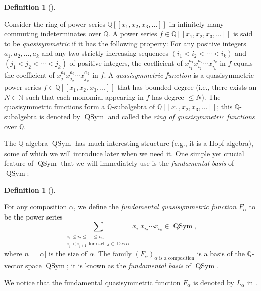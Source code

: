 \documentclass[numbers=enddot,12pt,final,onecolumn,notitlepage]{scrartcl}%
\theoremstyle{definition}
\newtheorem{defi}[theo]{Definition}
\newenvironment{definition}[1][]
{\begin{defi}[#1]\begin{leftbar}}
{\end{leftbar}\end{defi}}
\let\sumnonlimits\sum
\renewcommand{\sum}{\sumnonlimits\limits}
\begin{document}
\begin{definition}
Consider the ring of power series $\mathbb{Q}\left[  \left[  x_{1},x_{2}%
,x_{3},\ldots\right]  \right]  $ in infinitely many commuting indeterminates
over $\mathbb{Q}$. A power series $f\in\mathbb{Q}\left[  \left[  x_{1}%
,x_{2},x_{3},\ldots\right]  \right]  $ is said to be \textit{quasisymmetric}
if it has the following property: For any positive integers $a_{1}%
,a_{2},\ldots,a_{k}$ and any two strictly increasing sequences $\left(
i_{1}<i_{2}<\cdots<i_{k}\right)  $ and $\left(  j_{1}<j_{2}<\cdots
<j_{k}\right)  $ of positive integers, the coefficient of $x_{i_{1}}^{a_{1}%
}x_{i_{2}}^{a_{2}}\cdots x_{i_{k}}^{a_{k}}$ in $f$ equals the coefficient of
$x_{j_{1}}^{a_{1}}x_{j_{2}}^{a_{2}}\cdots x_{j_{k}}^{a_{k}}$ in $f$. A
\textit{quasisymmetric function} is a quasisymmetric power series
$f\in\mathbb{Q}\left[  \left[  x_{1},x_{2},x_{3},\ldots\right]  \right]  $
that has bounded degree (i.e., there exists an $N\in\mathbb{N}$ such that each
monomial appearing in $f$ has degree $\leq N$). The quasisymmetric functions
form a $\mathbb{Q}$-subalgebra of $\mathbb{Q}\left[  \left[  x_{1},x_{2}%
,x_{3},\ldots\right]  \right]  $; this $\mathbb{Q}$-subalgebra is denoted by
$\operatorname*{QSym}$ and called the \textit{ring of quasisymmetric
functions} over $\mathbb{Q}$.
\end{definition}

The $\mathbb{Q}$-algebra $\operatorname*{QSym}$ has much interesting structure
(e.g., it is a Hopf algebra), some of which we will introduce later when we
need it. One simple yet crucial feature of $\operatorname*{QSym}$ that we will
immediately use is the \textit{fundamental basis} of $\operatorname*{QSym}$:

\begin{definition}
For any composition $\alpha$, we define the \textit{fundamental quasisymmetric
function} $F_{\alpha}$ to be the power series%
\[
\sum_{\substack{i_{1}\leq i_{2}\leq\cdots\leq i_{n};\\i_{j}<i_{j+1}\text{ for
each }j\in\operatorname*{Des}\alpha}}x_{i_{1}}x_{i_{2}}\cdots x_{i_{n}}%
\in\operatorname*{QSym},
\]
where $n=\left\vert \alpha\right\vert $ is the size of $\alpha$. The family
$\left(  F_{\alpha}\right)  _{\alpha\text{ is a composition}}$ is a basis of
the $\mathbb{Q}$-vector space $\operatorname*{QSym}$; it is known as the
\textit{fundamental basis} of $\operatorname*{QSym}$.
\end{definition}

We notice that the fundamental quasisymmetric function $F_{\alpha}$ is denoted
by $L_{\alpha}$ in \cite[\S 5.2]{HopfComb}.
\end{document}
